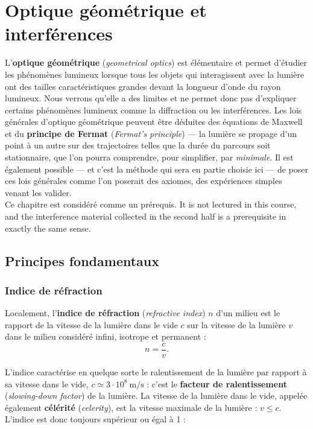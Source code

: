 \section{Optique géométrique et interférences}

L'\textbf{optique géométrique} (\textit{geometrical optics}) est élémentaire et
permet d'étudier les phénomènes lumineux lorsque tous les objets qui
interagissent avec la lumière ont des tailles caractéristiques grandes devant la
longueur d'onde du rayon lumineux. Nous verrons qu'elle a des limites et ne
permet donc pas d'expliquer certains phénomènes lumineux comme la diffraction ou
les interférences. Les lois générales d'optique géométrique peuvent être déduites
des équations de Maxwell et du \textbf{principe de Fermat}
(\textit{Fermat's principle}) --- la lumière se propage d'un point à un autre sur
des trajectoires telles que la durée du parcours soit stationnaire, que l'on
pourra comprendre, pour simplifier, par \emph{minimale}. Il est également
possible --- et c'est la méthode qui sera en partie choisie ici --- de poser ces
lois générales comme l'on poserait des axiomes, des expériences simples venant
les valider.\\

Ce chapitre est considéré comme un prérequis. It is not lectured in this course,
and the interference material collected in the second half is a prerequisite in
exactly the same sense.

\subsection{Principes fondamentaux}

\subsubsection{Indice de réfraction}

\begin{definition}
  Localement, l'\textbf{indice de réfraction} (\textit{refractive index}) $n$
  d'un milieu est le rapport de la vitesse de la lumière dans le vide $c$ sur la
  vitesse de la lumière $v$ dans le milieu considéré infini, isotrope et
  permanent :
  \[ n = \frac{c}{v}. \]
\end{definition}

L'indice caractérise en quelque sorte le ralentissement de la lumière par
rapport à sa vitesse dans le vide, $c \simeq 3\cdot 10^{8}\ \mathrm{m/s}$ : c'est
le \textbf{facteur de ralentissement} (\textit{slowing-down factor}) de la
lumière. La vitesse de la lumière dans le vide, appelée également
\textbf{célérité} (\textit{celerity}), est la vitesse maximale de la lumière :
$v \le c$. L'indice est donc toujours supérieur ou égal à 1 :

